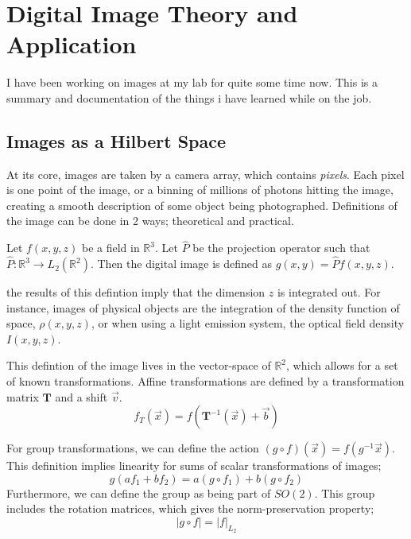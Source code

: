 \chapter{Digital Image Theory and Application}

I have been working on images at my lab for quite some time now. This is a summary and documentation of the things i have learned while on the job. 

\section{Images as a Hilbert Space}

At its core, images are taken by a camera array, which contains \textit{pixels}. Each pixel is one point of the image, or a binning of millions of photons hitting the image, creating a smooth description of some object being photographed. Definitions of the image can be done in 2 ways; theoretical and practical.
\begin{definition}
    Let $f(x,y,z)$ be a field in $\mathbb{R}^3$. Let $\hat P$ be the projection operator such that $\hat P:\mathbb{R}^3 \rightarrow L_2(\mathbb{R}^2)$. Then the digital image is defined as $g(x,y) = \hat{P}f(x,y,z)$.
\end{definition}
the results of this defintion imply that the dimension $z$ is integrated out. For instance, images of physical objects are the integration of the density function of space, $\rho(x,y,z)$, or when using a light emission system, the optical field density $I(x,y,z)$.

This defintion of the image lives in the vector-space of $\mathbb{R}^2$, which allows for a set of known transformations. Affine transformations are defined by a transformation matrix $\mathbf{T}$ and a shift $\vec{v}$. 
\begin{equation}
    f_T(\vec{x}) = f(\mathbf{T}^{-1}(\vec{x}) + \vec{b})
\end{equation}

For group transformations, we can define the action $(g\circ f)(\vec{x}) = f(g^{-1}\vec{x})$. This definition implies linearity for sums of scalar transformations of images;
\begin{equation}
    g (af_1 + bf_2) = a(g \circ f_1) + b (g \circ f_2)
\end{equation}
Furthermore, we can define the group as being part of $SO(2)$. This group includes the rotation matrices, which gives the norm-preservation property;
\begin{equation}
    |g\circ f| = |f|_{L_2}
\end{equation}

